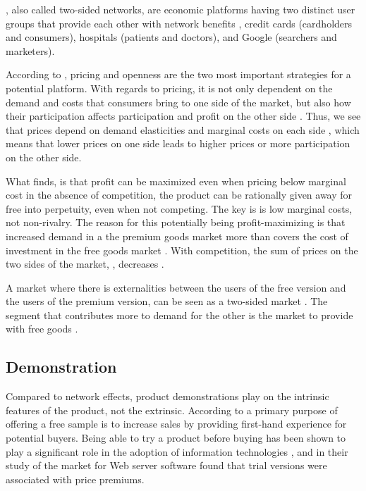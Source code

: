 , also called two-sided networks, are economic platforms having two distinct user groups that provide each other with network benefits \citep{parker2005,rochet2006}, \eg credit cards (cardholders and consumers), hospitals (patients and doctors), and Google (searchers and marketers).

According to \citet{rysman2009}, pricing and openness are the two most important strategies for a potential platform. With regards to pricing, it is not only dependent on the demand and costs that consumers bring to one side of the market, but also how their participation affects participation and profit on the other side \citep{rysman2009}. Thus, we see that prices depend on demand elasticities and marginal costs on each side \citep{rochet2003,rochet2006,weyl2009}, which means that lower prices on one side leads to higher prices or more participation on the other side.

What \citet{parker2005} finds, is that profit can be maximized even when pricing below marginal cost in the absence of competition, \eg the product can be rationally given away for free into perpetuity, even when not competing. The key is is low marginal costs, not non-rivalry. The reason for this potentially being profit-maximizing is that increased demand in a the premium goods market more than covers the cost of investment in the free goods market \citep{parker2005,rysman2009}. With competition, the sum of prices on the two sides of the market, \ie {}, decreases \citep{weyl2006}.

A market where there is externalities between the users of the free version and the users of the premium version, can be seen as a two-sided market \citep{parker2005}. The segment that contributes more to demand for the other is the market to provide with free goods \citep{parker2005}.

\subsection{Demonstration}
\label{section:free:demonstration}

Compared to network effects, product demonstrations play on the intrinsic features of the product, not the extrinsic. According to \citet{faugere2007} a primary purpose of offering a free sample is to increase sales by providing first-hand experience for potential buyers. Being able to try a product before buying has been shown to play a significant role in the adoption of information technologies \citep{agarwal1997}, and in their study of the market for Web server software \citet{gallaugher2002} found that trial versions were associated with price premiums.

